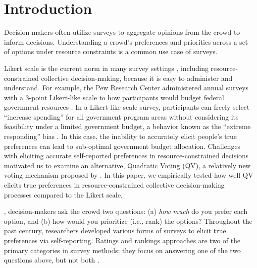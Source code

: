 \section{Introduction}
Decision-makers often utilize surveys to aggregate opinions from the crowd to inform decisions. Understanding a crowd's preferences and priorities across a set of options under resource constraints is a common use case of surveys. 

Likert scale is the current norm in many survey settings \cite{moors2016two}, including resource-constrained collective decision-making, because it is easy to administer and understand. For example, the Pew Research Center administered annual surveys with a 3-point Likert-like scale to  how participants would budget federal government resources \cite{pew_spending}. In a Likert-like scale survey, participants can freely select ``increase spending'' for all government program areas without considering its feasibility under a limited government budget, a behavior known as the ``extreme responding'' bias \cite{batchelor2016extreme, furnham1986response, meisenberg2008acquiescent}. In this case, the inability to accurately elicit people's true preferences can lead to sub-optimal government budget allocation. Challenges with eliciting accurate self-reported preferences in resource-constrained decisions motivated us to examine an alternative, Quadratic Voting (QV), a relatively new voting mechanism proposed by \textcite{posner2018radical}. In this paper, we empirically tested how well QV elicits true preferences in resource-constrained collective decision-making processes compared to the Likert scale.  

, decision-makers ask the crowd two questions: (a) \textit{how much} do you prefer each option, and (b) how would you prioritize (i.e., rank) the options? Throughout the past century, researchers developed various forms of surveys to elicit true preferences via self-reporting. Ratings and rankings approaches are two of the primary categories in survey methods; they focus on answering one of the two questions above, but not both \cite{moors2016two}. 

